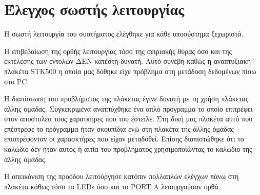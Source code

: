 \documentclass[a4paper,12pt]{article}
\begin{document}
\section{Έλεγχος σωστής λειτουργίας}
Η σωστή λειτουργία του συστήματος ελέγθηκε για κάθε υποσύστημα ξεχωριστά. 

Η επιβεβαίωση της ορθής λειτουργίας τόσο της σειριακής θύρας όσο και της εκτέλεσης των εντολών ΔΕΝ κατέστη δυνατή. Αυτό συνέβη καθώς η αναπτυξιακή πλακέτα STK500 η οποία μας δόθηκε είχε πρόβλημα στη μετάδοση δεδομένων πίσω στο PC.

Η διαπίστωση του προβλήμστος της πλάκετας έγινε δυνατή με τη χρήση πλάκετας άλλης ομάδας. Συγκεκριμένα ανατπύχθηκε ένα απλό πρόγραμμα το οποίο επιτρέφει στον αποστολέα τους χαρατκήρες που του έστειλε. Στη δική μας πλακέτα αυτό που επέστρεφε το πρόγραμμα ήταν σκουπίδια ενώ στη πλακέτα της άλλης όμάδας επιστρέφονταν οι χαρασκτήρες που είχαν μεταδοθεί. Επίσης διαπιστώθηκε ότι το καλώδιο δεν ήταν αυτός ή αιτία του προβλήματος χρησιμοποιώντας το καλώδιο της άλλης ομάδας. 

Η απεικόνιση της προόδου λειτούργησε κατόπιν πολλαπλών ελέγχων πάνω στη πλακέτα κάθως τόσο τα LEDs όσο και το PORT A λειουργούσαν ορθά.  



\end{document}
